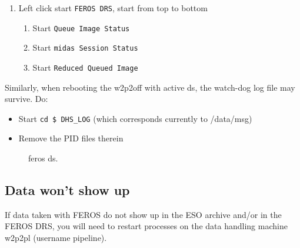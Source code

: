 \documentclass[11pt,fleqn,a4paper]{book}
\begin{document}
\begin{enumerate}
\begin{enumerate}
\begin{enumerate}
             \end{enumerate}
        \item \label{list:DRS} Left click start \texttt{FEROS DRS}, start from top to bottom
            \begin{enumerate}
                \item Start \texttt{Queue Image Status}
                \item Start \texttt{\gls{midas} Session Status}
                \item Start \texttt{Reduced Queued Image}
            \end{enumerate}
    \end{enumerate}
\end{enumerate}
  
Similarly, when rebooting the \gls{w2p2off} with active \gls{ds}, the watch-dog log file may survive. Do:
\begin{itemize}
    \item Start \texttt{cd \$ DHS\_LOG} (which corresponds currently to /data/msg)
    \item Remove the PID files therein
\end{itemize}

\begin{figure}[t!]
\begin{minipage}{0.48\linewidth}
\end{minipage}
\hspace{0.02\linewidth}
\begin{minipage}{0.48\linewidth}
\end{minipage}
\caption[FEROS DRS]{\gls{feros} \gls{ds}.}
\end{figure}

\subsection{Data won't show up}

If data taken with FEROS do not show up in the ESO archive and/or in the
FEROS DRS, you will need to restart processes on the data handling machine \gls{w2p2pl} (username pipeline).
\end{document}
